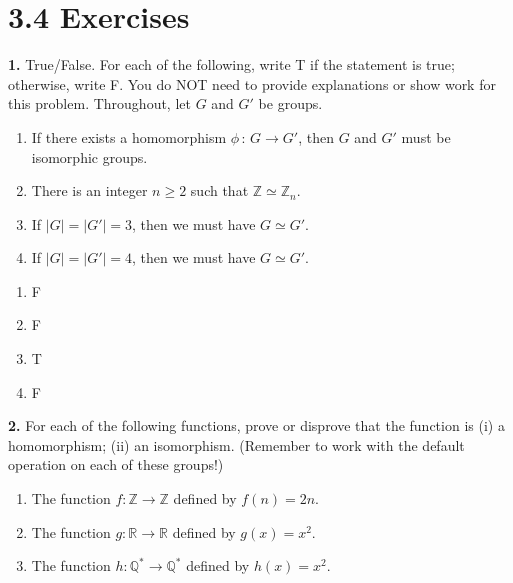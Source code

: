 \documentclass[10pt,]{book}
\theoremstyle{plain}
\theoremstyle{definition}
\theoremstyle{definition}
\theoremstyle{definition}
\theoremstyle{definition}
\numberwithin{equation}{section}
\def\Z{\mathbb{Z}}
\def\R{\mathbb{R}}
\def\Q{\mathbb{Q}}
\begin{document}
\section*{3.4 Exercises}
\noindent\textbf{1.}\quad{}
        True/False. For each of the following, write T if the statement is
        true; otherwise, write F. You do NOT need to provide explanations or show work for this problem. Throughout, let \(G\) and \(G'\) be groups.
        \leavevmode%
\begin{enumerate}[label=(\alph*)]
\item\hypertarget{li-154}{}
              If there exists a homomorphism \(\phi\,:\,G\to G'\), then \(G\) and \(G'\) must be isomorphic groups.
\item\hypertarget{li-155}{}
              There is an integer \(n\geq 2\) such that \(\Z\simeq \Z_n\).
\item\hypertarget{li-156}{}
              If \(|G|=|G'|=3\), then we must have \(G\simeq G'\).
\item\hypertarget{li-157}{}
              If \(|G|=|G'|=4\), then we must have \(G\simeq G'\).
\end{enumerate}

\par\smallskip
\leavevmode%
\begin{multicols}{4}
\begin{enumerate}[label=(\alph*)]
\item\hypertarget{li-158}{}
          F
\item\hypertarget{li-159}{}
          F
\item\hypertarget{li-160}{}
          T
\item\hypertarget{li-161}{}
          F
\end{enumerate}
\end{multicols}
\par\smallskip
\noindent\textbf{2.}\quad{}
        For each of the following functions, prove or
        disprove that the function is (i) a homomorphism; (ii)
        an isomorphism. (Remember to work with the default operation on each of these groups!)
        \leavevmode%
\begin{enumerate}[label=(\alph*)]
\item\hypertarget{li-162}{}
              The function \(f:\Z\to\Z\) defined by \(f(n)=2n\).
\item\hypertarget{li-163}{}
              The function \(g:\R\to\R\) defined by \(g(x)=x^2\).
\item\hypertarget{li-164}{}
              The function \(h:\Q^*\to\Q^*\) defined by
              \(h(x)=x^2\).
\end{enumerate}
\end{document}
